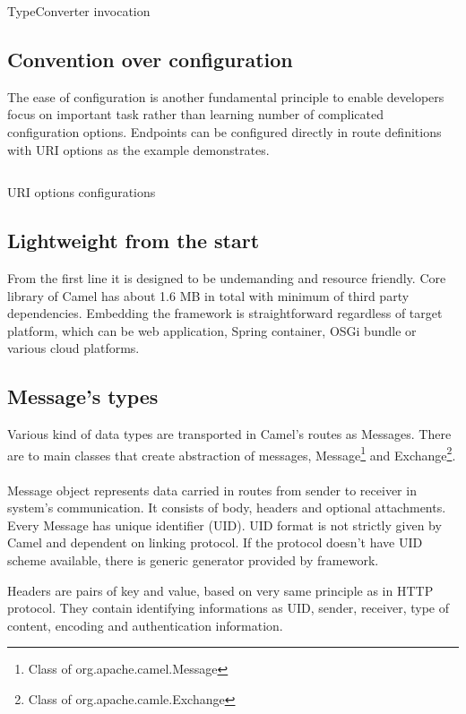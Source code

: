 \documentclass[12pt,final,oneside]{fithesis2}
\begin{document}
\begin{listing}[ht]
	\inputminted[]{java}{sources/converter.java}
	\caption{TypeConverter invocation}
\end{listing}

\subsection*{Convention over configuration}
The ease of configuration is another fundamental principle to enable developers focus on important task rather than learning number of complicated configuration options. Endpoints can be configured directly in route definitions with URI options as the example demonstrates.
\begin{listing}[ht]
	\inputminted[]{java}{sources/uri.java}
	\caption{URI options configurations}
\end{listing}


\subsection*{Lightweight from the start}
From the first line it is designed to be undemanding and resource friendly. Core library of Camel has about 1.6 MB in total with minimum of third party dependencies.  Embedding the framework is straightforward regardless of target platform, which can be web application, Spring container, OSGi bundle or various cloud platforms. 

\subsection{Message's types}
Various kind of data types are transported in Camel's routes as Messages. There are to main classes that create abstraction of messages, Message\footnote{Class of org.apache.camel.Message} and Exchange\footnote{Class of org.apache.camle.Exchange}.
\\ \\
Message object represents data carried in routes from sender to receiver in system's communication. It consists of body, headers and optional attachments. Every Message has unique identifier (UID). UID format is not strictly given by Camel and dependent on linking protocol. If the protocol doesn't have UID scheme available, there is generic generator provided by framework.

Headers are pairs of key and value, based on very same principle as in HTTP protocol. They contain identifying informations as UID, sender, receiver, type of content, encoding and authentication information.
\end{document}
